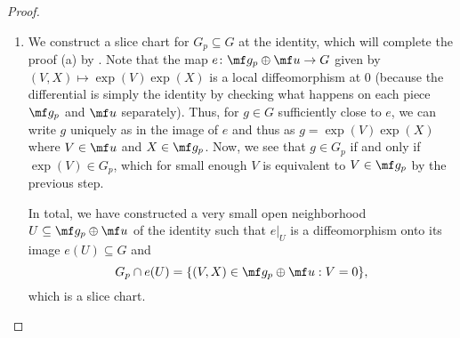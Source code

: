 \documentclass[../notes.tex]{subfiles}
\begin{document}
\begin{proof}
\begin{enumerate}
		\item We construct a slice chart for $G_p\subseteq G$ at the identity, which will complete the proof (a) by . Note that the map $e\colon\mf g_p\oplus\mf u\to G$ given by $(V,X)\mapsto\exp(V)\exp(X)$ is a local diffeomorphism at $0$ (because the differential is simply the identity by checking what happens on each piece $\mf g_p$ and $\mf u$ separately). Thus, for $g\in G$ sufficiently close to $e$, we can write $g$ uniquely as in the image of $e$ and thus as $g=\exp(V)\exp(X)$ where $V\in\mf u$ and $X\in\mf g_p$. Now, we see that $g\in G_p$ if and only if $\exp(V)\in G_p$, which for small enough $V$ is equivalent to $V\in\mf g_p$ by the previous step.

		In total, we have constructed a very small open neighborhood $U\subseteq\mf g_p\oplus\mf u$ of the identity such that $e|_U$ is a diffeomorphism onto its image $e(U)\subseteq G$ and
		\[G_p\cap e(U)=\{(V,X)\in\mf g_p\oplus\mf u:V=0\},\]
		which is a slice chart.
		\qedhere

		
	\end{enumerate}
\end{proof}
\end{document}
